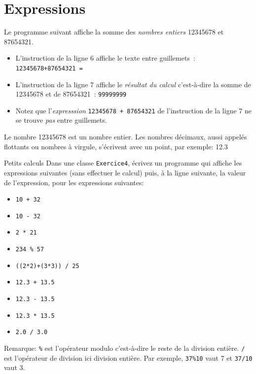 \documentclass[a4paper,11pt]{style-esi/td}
\begin{document}
\section{Expressions}

Le programme suivant affiche la somme des \emph{nombres entiers}  12345678 et 87654321.


\begin{itemize}
	\item	L'instruction de la ligne 6 affiche le texte entre guillemets~: \texttt{12345678+87654321 = }

	\item L'instruction de la ligne 7 affiche le \emph{résultat du calcul}
	      c'est-à-dire la somme de 12345678 et de 87654321~:  \texttt{99999999}

	\item Notez que l'\emph{expresssion} \texttt{12345678 + 87654321}
	      de l'instruction de la ligne 7 ne se trouve \emph{pas} entre guillemets.
\end{itemize}

Le nombre 12345678 est un nombre entier. Les nombres décimaux, aussi appelés flottants ou nombres à virgule, s'écrivent avec un point, par exemple: 12.3


\begin{Exercice}{Petits calculs}
	Dans une classe \texttt{Exercice4}, écrivez un programme qui affiche les expressions suivantes (sans effectuer le calcul) puis, à la ligne suivante,
	la valeur de l'expression, pour les expressions	suivantes:
	\begin{itemize}
		\item \texttt{10 + 32}
		\item \texttt{10 - 32}
		\item \texttt{2 * 21}
		\item \texttt{234 \% 57}
		\item \texttt{((2*2)+(3*3)) / 25}
		\item \texttt{12.3 + 13.5}
		\item \texttt{12.3 - 13.5}
		\item \texttt{12.3 * 13.5}
		\item \texttt{2.0 / 3.0}
	\end{itemize}

	Remarque: \texttt{\%} est l'opérateur modulo c'est-à-dire le reste de la division entière.
	\texttt{/} est l'opérateur de division ici division entière. Par exemple,
	\texttt{37\%10} vaut 7 et \texttt{37/10} vaut 3.

\end{Exercice}
\end{document}
